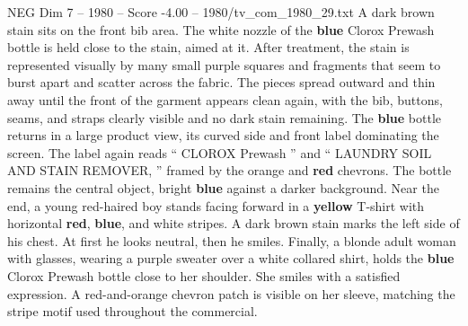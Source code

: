 \begin{textsample}{NEG Dim 7 – 1980 – Score -4.00 – 1980/tv\_com\_1980\_29.txt}
A dark brown stain sits on the front bib area.
The white nozzle of the \textbf{blue} Clorox Prewash bottle is held close to the stain, aimed at it.
After treatment, the stain is represented visually by many small purple squares and fragments that seem to burst apart and scatter across the fabric.
The pieces spread outward and thin away until the front of the garment appears clean again, with the bib, buttons, seams, and straps clearly visible and no dark stain remaining.
The \textbf{blue} bottle returns in a large product view, its curved side and front label dominating the screen.
The label again reads “ CLOROX Prewash ” and “ LAUNDRY SOIL AND STAIN REMOVER, ” framed by the orange and \textbf{red} chevrons.
The bottle remains the central object, bright \textbf{blue} against a darker background.
Near the end, a young red-haired boy stands facing forward in a \textbf{yellow} T-shirt with horizontal \textbf{red}, \textbf{blue}, and white stripes.
A dark brown stain marks the left side of his chest.
At first he looks neutral, then he smiles.
Finally, a blonde adult woman with glasses, wearing a purple sweater over a white collared shirt, holds the \textbf{blue} Clorox Prewash bottle close to her shoulder.
She smiles with a satisfied expression.
A red-and-orange chevron patch is visible on her sleeve, matching the stripe motif used throughout the commercial.

\end{textsample}
